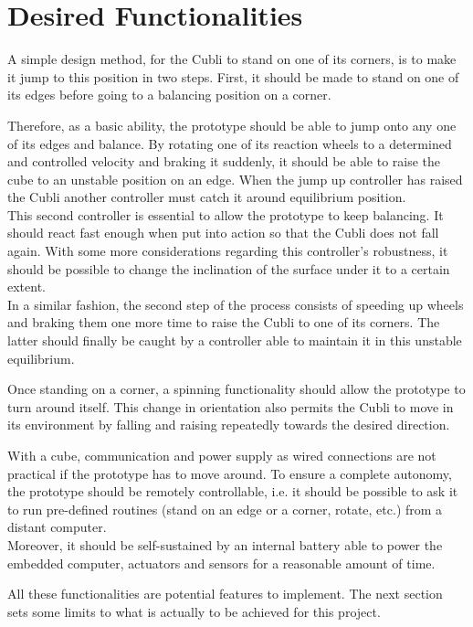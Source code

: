 \section{Desired Functionalities}\label{sec:mainFunctionalities}

A simple design method, for the Cubli to stand on one of its corners, is to make it jump to this position in two steps. First, it should be made to stand on one of its edges before going to a balancing position on a corner.

Therefore, as a basic ability, the prototype should be able to jump onto any one of its edges and balance.
By rotating one of its reaction wheels to a determined and controlled velocity and braking it suddenly, it should be able to raise the cube to an unstable position on an edge. When the jump up controller has raised the Cubli another controller must catch it around equilibrium position.\\
This second controller is essential to allow the prototype to keep balancing. It should react fast enough when put into action so that the Cubli does not fall again. With some more considerations regarding this controller's robustness, it should be possible to change the inclination of the surface under it to a certain extent.\\
In a similar fashion, the second step of the process consists of speeding up wheels and braking them one more time to raise the Cubli to one of its corners. The latter should finally be caught by a controller able to maintain it in this unstable equilibrium.

Once standing on a corner, a spinning functionality should allow the prototype to turn around itself. This change in orientation also permits the Cubli to move in its environment by falling and raising repeatedly towards the desired direction.

With a cube, communication and power supply as wired connections are not practical if the prototype has to move around. To ensure a complete autonomy, the prototype should be remotely controllable, i.e. it should be possible to ask it to run pre-defined routines (stand on an edge or a corner, rotate, etc.) from a distant computer.\\
Moreover, it should be self-sustained by an internal battery able to power the embedded computer, actuators and sensors for a reasonable amount of time.

All these functionalities are potential features to implement. The next section sets some limits to what is actually to be achieved for this project.